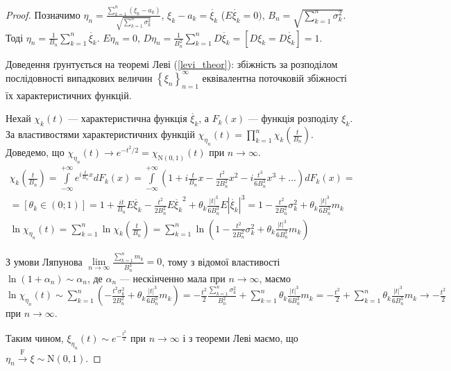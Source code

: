 \begin{proof}
    Позначимо $\eta_n = \frac{\sum\limits_{k=1}^n (\xi_k - a_k)}
    {\sqrt{\sum\limits_{k=1}^n \sigma_k^2}}$, $\xi_k - a_k = \mathring{\xi_k}$ ($E\mathring{\xi_k} = 0)$, 
    $B_n = \sqrt{\sum\limits_{k=1}^n \sigma_k^2}$. 
    Тоді $\eta_n = \frac{1}{B_n}\sum\limits_{k=1}^n \mathring{\xi_k}$.
    $E\eta_n = 0$, $D\eta_n = \frac{1}{B_n^2}\sum\limits_{k=1}^n D\mathring{\xi_k} = 
    \left[D\xi_k = D\mathring{\xi_k}\right] = 1$.

    Доведення ґрунтується на теоремі Леві (\ref{levi_theor}): збіжність за розподілом послідовності 
    випадкових величин $\left\{ \xi_n\right\}_{n=1}^{\infty}$ еквівалентна поточковій збіжності їх
    характеристичних функцій.

    Нехай $\chi_k(t)$ --- характеристична функція $\mathring{\xi_k}$, а $F_k(x)$ --- 
    функція розподілу $\xi_k$.
    За властивостями характеристичних функцій $\chi_{\eta_n}(t) = 
    \prod\limits_{k=1}^n \chi_k(\frac{t}{B_n})$. 
    Доведемо, що $\chi_{\eta_n}(t)\to e^{-t^2/2} = 
    \chi_{\mathrm{N}(0, 1)}(t)$ при $ n \to \infty$.
    \begin{gather*}\chi_k\left(\frac{t}{B_n}\right) = \int\limits_{-\infty}^{+\infty} e^{i\frac{t}{B_n}x} dF_k(x) = 
    \int\limits_{-\infty}^{+\infty} \left(1 + i\frac{t}{B_n}x - \frac{t^2}{2B_n^2}x^2 - 
    i\frac{t^3}{6B_n^3}x^3 + ...\right) dF_k(x) = \\ = \left[\theta_k \in (0; 1)\right]
    = 1 + \frac{it}{B_n}E\mathring{\xi_k} - \frac{t^2}{2B_n^2}
    E\mathring{\xi_k}^2 + \theta_k\frac{|t|^3}{6B_n^3}E|\mathring{\xi_k}|^3 = 
    1 - \frac{t^2}{2B_n^2}\sigma_k^2 + \theta_k\frac{|t|^3}{6B_n^3}m_k \\
    \ln\chi_{\eta_n}(t) = \sum\limits_{k=1}^n \ln \chi_k \left(\frac{t}{B_n}\right) = 
    \sum\limits_{k=1}^n \ln\left(1 - \frac{t^2}{2B_n^2}\sigma_k^2 + 
    \theta_k\frac{|t|^3}{6B_n^3}m_k\right)
    \end{gather*}

    З умови Ляпунова $\underset{n \rightarrow \infty}{\lim} \frac{\sum\limits_{k=1}^n m_k}{B_n^3} = 0$, 
    тому з відомої властивості $\ln(1 + \alpha_n) \sim \alpha_n$, де $\alpha_n$ --- нескінченно мала при 
    $n \rightarrow \infty$, маємо $\ln\chi_{\eta_n}(t) \sim \sum\limits_{k=1}^n\left(
        -\frac{t^2\sigma^2_k}{2B_n^2} + \theta_k\frac{|t|^3}{6B_n^3}m_k
    \right) 
    = -\frac{t^2}{2}\frac{\sum\limits_{k=1}^n\sigma_k^2}{B_n^2} + \sum\limits_{k=1}^n \theta_k\frac{|t|^3}{6B_n^3}m_k= -\frac{t^2}{2} 
    + \sum\limits_{k=1}^n \theta_k\frac{|t|^3}{6B_n^3}m_k \to -\frac{t^2}{2} 
    $ при $n \rightarrow \infty$.
    
    Таким чином, $\xi_{\eta_n}(t) \sim e^{-\frac{t^2}{2}}$ при $n \rightarrow \infty$ і 
    з теореми Леві маємо, що $\eta_n \overset{\mathrm{F}}{\longrightarrow} \xi \sim \mathrm{N}(0, 1)$.
\end{proof}
